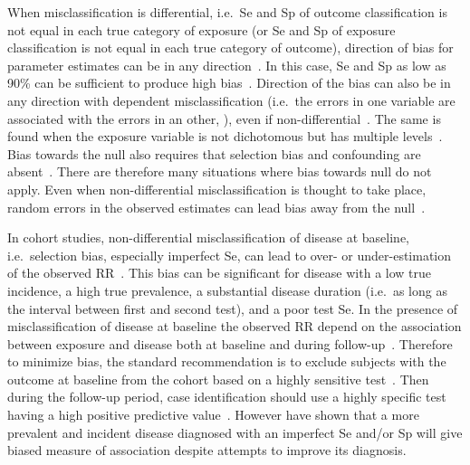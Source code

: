 \documentclass[utf8]{frontiersSCNS}\usepackage[]{graphicx}\usepackage[]{color}
\begin{document}
When misclassification is differential, i.e.\ Se and Sp of outcome
classification is not equal in each true category of exposure (or Se and Sp of
exposure classification is not equal in each true category of outcome),
direction of bias for parameter estimates can be in any
direction~\citep{Dosemeci_1990,Neuhaus_1999,Chen_2013}.
In this case, Se and Sp as low as 90\% can be sufficient to produce high
bias~\citep{Kristensen_1992}.
Direction of the bias can also be in any direction with dependent
misclassification (i.e.\ the errors in one variable are associated with the
errors in an other, \citealp{Assakul_1967,Greenland_1989}), even if
non-differential~\citep{Kristensen_1992}.
The same is found when the exposure variable is not dichotomous but has multiple
levels~\citep{Dosemeci_1990,Weinberg_1994}.
Bias towards the null also requires that selection bias and confounding are
absent~\citep{Jurek_2004}.
There are therefore many situations where bias towards null do not apply.
Even when non-differential misclassification is thought to take place, random
errors in the observed estimates can lead bias away from the
null~\citep{Jurek_2004}.

In cohort studies, non-differential misclassification of disease at baseline,
i.e.\ selection bias, especially imperfect Se, can lead to over- or
under-estimation of the observed RR~\citep{Pekkanen2006}.
This bias can be significant for disease with a low true incidence, a high true
prevalence, a substantial disease duration (i.e.\ as long as the interval between
first and second test), and a poor test Se.
In the presence of misclassification of disease at baseline the observed RR
depend on the association between exposure and disease both at baseline and
during follow-up~\citep{Pekkanen2006}.
Therefore to minimize bias, the standard recommendation is to exclude subjects
with the outcome at baseline from the cohort based on a highly sensitive
test~\citep{Pekkanen2008}.
Then during the follow-up period, case identification should use a highly
specific test having a high positive predictive value~\citep{Brenner1993}.
However \cite{Haine2017} have shown that a more prevalent and incident disease
diagnosed with an imperfect Se and/or Sp will give biased measure of association
despite attempts to improve its diagnosis.
\end{document}
